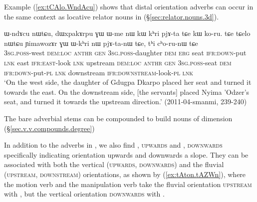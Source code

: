  Example (\ref{ex:tCAlo.WndAcu}) shows that distal orientation adverbs can occur in the same context as locative relator nouns in  (§\ref{sec:relator.nouns.3d}).

 \begin{exe}
\ex \label{ex:tCAlo.WndAcu}
\gll ɯ-ndɤcu nɯtɕu, dɯxpakɤrpu ɣɯ ɯ-me nɯ kɯ kʰri pjɤ-ta tɕe kɯ ko-ru.
tɕe tɕelo nɯtɕu ɲimawozɤr ɣɯ ɯ-kʰri nɯ pjɤ-ta-nɯ tɕe, tʰi cʰo-ru-nɯ tɕe \\
\textsc{3sg}.\textsc{poss}-west \textsc{dem}:\textsc{loc}  \textsc{anthr} \textsc{gen} \textsc{3sg}.\textsc{poss}-daughter \textsc{dem} \textsc{erg} seat \textsc{ifr}:\textsc{down}-put \textsc{lnk} east \textsc{ifr}:\textsc{east}-look  \textsc{lnk} upstream \textsc{dem}:\textsc{loc}  \textsc{anthr} \textsc{gen} \textsc{3sg}.\textsc{poss}-seat \textsc{dem} \textsc{ifr}:\textsc{down}-put-\textsc{pl} \textsc{lnk} downstream \textsc{ifr}:\textsc{downstream}-look-\textsc{pl} \textsc{lnk} \\ 
\glt `On the west side, the daughter of Gdugpa Dkarpo placed her seat and turned it towards the east. On the downstream side, [the servants] placed Nyima 'Odzer's seat, and turned it towards the upstream direction.' (2011-04-smanmi, 239-240)
 \end{exe}

The bare adverbial stems can be compounded to build nouns of dimension (§\ref{sec.v.v.compounds.degree})

In addition to the adverbs in , we also find , \textsc{upwards} and , \textsc{downwards} specifically indicating orientation upwards and downwards a slope. They can be associated with both the vertical (\textsc{upwards}, \textsc{downwards}) and the fluvial (\textsc{upstream}, \textsc{downstream}) orientations, as shown by (\ref{ex:tAton.tAZWn}), where the motion verb  and the manipulation verb  take the fluvial orientation \textsc{upstream} with , but the vertical orientation \textsc{downwards} with .

